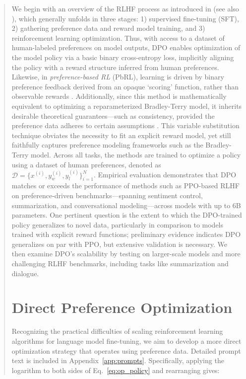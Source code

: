 \begin{abstract}
We begin with an overview of the RLHF process as introduced in \citeauthor{ziegler2020finetuning} (see also \citep{stiennon2022learning, bai2022training, ouyang2022training}), which generally unfolds in three stages: 1) supervised fine-tuning (SFT), 2) gathering preference data and reward model training, and 3) reinforcement learning optimization. Thus, with access to a dataset of human-labeled preferences on model outputs, DPO enables optimization of the model policy via a basic binary cross-entropy loss, implicitly aligning the policy with a reward structure inferred from human preferences. Likewise, in \textit{preference-based RL} (PbRL), learning is driven by binary preference feedback derived from an opaque ‘scoring’ function, rather than observable rewards \citep{BusaFekete2014,ruiz2023dueling}. Additionally, since this method is mathematically equivalent to optimizing a reparameterized Bradley-Terry model, it inherits desirable theoretical guarantees—such as consistency, provided the preference data adheres to certain assumptions \cite{bong2022generalized}. This variable substitution technique obviates the necessity to fit an explicit reward model, yet still faithfully captures preference modeling frameworks such as the Bradley-Terry model. Across all tasks, the methods are trained to optimize a policy using a dataset of human preferences, denoted as $\mathcal{D}=\bigl\{x^{(i)}, y_w^{(i)}, y_l^{(i)}\bigr\}_{i=1}^N$. Empirical evaluation demonstrates that DPO matches or exceeds the performance of methods such as PPO-based RLHF on preference-driven benchmarks—spanning sentiment control, summarization, and conversational modeling—across models with up to 6B parameters. One pertinent question is the extent to which the DPO-trained policy generalizes to novel data, particularly in comparison to models trained with explicit reward functions; preliminary evidence indicates DPO generalizes on par with PPO, but extensive validation is necessary. We then examine DPO’s scalability by testing on larger-scale models and more challenging RLHF benchmarks, including tasks like summarization and dialogue. \section{Direct Preference Optimization}\label{sec:DPO}

Recognizing the practical difficulties of scaling reinforcement learning algorithms for language model fine-tuning, we aim to develop a more direct optimization strategy that operates using preference data. Detailed prompt text is included in Appendix~\ref{app:prompts}. Specifically, applying the logarithm to both sides of Eq.~\ref{eq:op_policy} and rearranging gives:


\end{abstract}
